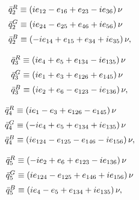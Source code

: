 \documentclass[letterpaper,12pt,titlepage,oneside,final]{book}
\newcommand{\spacer}{0.2cm}
\begin{document}
\begin{equation}\begin{array}{l}\label{triplet2}
\bar{q}^R_{2}\equiv\left(ie_{12}-e_{16}+e_{23}-ie_{36}\right)\nu   \vspace{\spacer} \\
\bar{q}^G_{2}\equiv\left(ie_{24}-e_{25}+e_{46}+ie_{56}\right)\nu \vspace{\spacer} \\
\bar{q}^B_{2}\equiv\left(-ie_{14}+e_{15}+e_{34}+ie_{35}\right)\nu, \vspace{\spacer} \\
\end{array}\end{equation}
\begin{equation}\begin{array}{l}\label{triplet3}
\bar{q}^R_{3}\equiv\left(ie_{4}+e_{5}+e_{134}-ie_{135}\right)\nu   \vspace{\spacer} \\
\bar{q}^G_{3}\equiv\left(ie_{1}+e_{3}+e_{126}+e_{145}\right)\nu   \vspace{\spacer} \\
\bar{q}^B_{3}\equiv\left(ie_{2}+e_{6}-e_{123}-ie_{136}\right)\nu,   \vspace{\spacer} \\
\end{array}\end{equation}
\begin{equation}\begin{array}{l}\label{triplet4}
\bar{q}^R_{4}\equiv\left(ie_{1}-e_{3}+e_{126}-e_{145}\right)\nu   \vspace{\spacer} \\
\bar{q}^G_{4}\equiv\left(-ie_{4}+e_{5}+e_{134}+ie_{135}\right)\nu   \vspace{\spacer} \\
\bar{q}^B_{4}\equiv\left(ie_{124}-e_{125}-e_{146}-ie_{156}\right)\nu,   \vspace{\spacer} \\
\end{array}\end{equation}
\begin{equation}\begin{array}{l}\label{triplet5}
\bar{q}^R_{5}\equiv\left(-ie_{2}+e_{6}+e_{123}-ie_{136}\right)\nu   \vspace{\spacer} \\
\bar{q}^G_{5}\equiv\left(ie_{124}-e_{125}+e_{146}+ie_{156}\right)\nu   \vspace{\spacer} \\
\bar{q}^B_{5}\equiv\left(ie_{4}-e_{5}+e_{134}+ie_{135}\right)\nu,   \vspace{\spacer} \\
\end{array}\end{equation}
\end{document}
